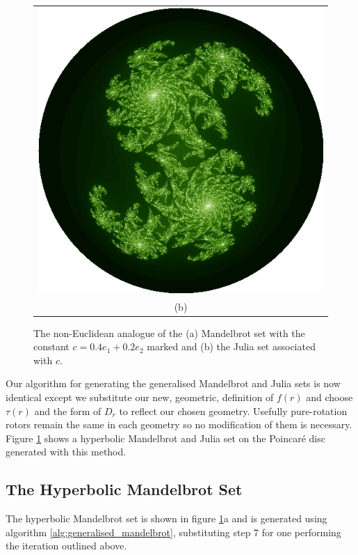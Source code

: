 \begin{enumarate}
\begin{figure}[p]
\begin{tabular}{c}
\includegraphics[width=0.35\textheight]{julia_hyp} \\
                          (b)
\end{tabular}
\caption{\label{fig:noneuclidean_sets}The non-Euclidean analogue of the (a) Mandelbrot set with
  the constant $c = 0.4e_1 + 0.2e_2$ marked and (b) the Julia
  set associated with $c$.}
\end{figure}

Our algorithm for generating the generalised Mandelbrot and Julia sets is now identical
except we substitute our new, geometric, definition of $f(r)$ and choose $\tau(r)$
and the form of $D_r$ to reflect our chosen geometry. Usefully pure-rotation rotors remain
the same in each geometry so no modification of them is necessary. Figure
\ref{fig:noneuclidean_sets} shows a hyperbolic Mandelbrot and Julia set on the
Poincar\'e disc generated with this method. 

\subsection{The Hyperbolic Mandelbrot Set}

The hyperbolic Mandelbrot set is shown in figure \ref{fig:noneuclidean_sets}a and
is generated using algorithm \ref{alg:generalised_mandelbrot}, substituting
step 7 for one performing the iteration outlined above. 


\end{enumarate}
